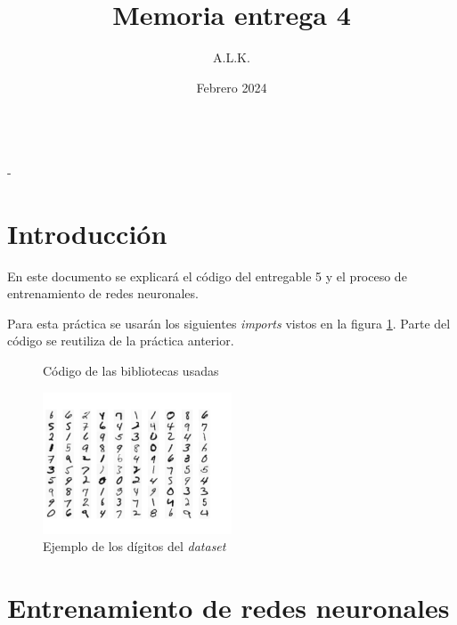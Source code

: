 \documentclass[6pt]{../../shared/AiTex}
\title{Memoria entrega 4}
\author{A.L.K.}
\date{Febrero 2024}
\begin{document}
\justify

\begin{center}

    {\huge \textbf{\underline{\subtitulo}}} \\
    { \lesson - \autor}

\end{center}


\section*{Introducción}

En este documento se explicará el código del entregable 5 y el proceso de entrenamiento de redes neuronales.

Para esta práctica se usarán los siguientes \textit{imports} vistos en la figura \ref{fig:imports}. Parte del código se reutiliza de la práctica anterior.
\begin{figure}[H]
    \centering
    
    \caption{Código de las bibliotecas usadas}
    \label{fig:imports}
\end{figure}

\begin{figure}[H]
    \centering
    \includegraphics[width=0.5\textwidth]{./imagenes/dataset.png}
    \caption{Ejemplo de los dígitos del \textit{dataset}}
    \label{fig:digitos}
\end{figure}

\section{Entrenamiento de redes neuronales}
\end{document}
